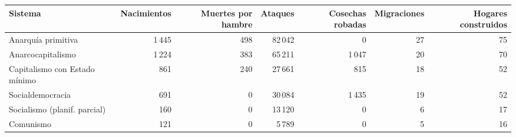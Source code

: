 \begin{tabular}{lrrrrrr}
\toprule
Sistema & Nacimientos & Muertes por hambre & Ataques & Cosechas robadas & Migraciones & Hogares construidos \\
\midrule
Anarquía primitiva & 1\,445 & 498 & 82\,042 & 0 & 27 & 75 \\
Anarcocapitalismo & 1\,224 & 383 & 65\,211 & 1\,047 & 20 & 70 \\
Capitalismo con Estado mínimo & 861 & 240 & 27\,661 & 815 & 18 & 52 \\
Socialdemocracia & 691 & 0 & 30\,084 & 1\,435 & 19 & 52 \\
Socialismo (planif. parcial) & 160 & 0 & 13\,120 & 0 & 6 & 17 \\
Comunismo & 121 & 0 & 5\,789 & 0 & 5 & 16 \\
\bottomrule
\end{tabular}
